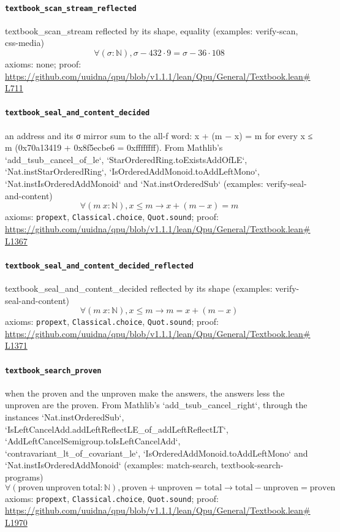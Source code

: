 \documentclass[11pt]{article}
\begin{document}
\paragraph{\texttt{textbook\_scan\_stream\_reflected}}
textbook\_scan\_stream reflected by its shape, equality (examples: verify-scan, css-media)
\[ \forall (\sigma : \mathbb{N}), \sigma - 432 \cdot 9 = \sigma - 36 \cdot 108 \]
\noindent axioms: none; proof: \url{https://github.com/uuidna/qpu/blob/v1.1.1/lean/Qpu/General/Textbook.lean\#L711}

\paragraph{\texttt{textbook\_seal\_and\_content\_decided}}
an address and its σ mirror sum to the all-f word: x + (m − x) = m for every x ≤ m (0x70a13419 + 0x8f5ecbe6 = 0xffffffff). From Mathlib's `add\_tsub\_cancel\_of\_le`, `StarOrderedRing.toExistsAddOfLE`, `Nat.instStarOrderedRing`, `IsOrderedAddMonoid.toAddLeftMono`, `Nat.instIsOrderedAddMonoid` and `Nat.instOrderedSub` (examples: verify-seal-and-content)
\[ \forall (m\ x : \mathbb{N}), x \le m \to x + (m - x) = m \]
\noindent axioms: \texttt{propext}, \texttt{Classical.choice}, \texttt{Quot.sound}; proof: \url{https://github.com/uuidna/qpu/blob/v1.1.1/lean/Qpu/General/Textbook.lean\#L1367}

\paragraph{\texttt{textbook\_seal\_and\_content\_decided\_reflected}}
textbook\_seal\_and\_content\_decided reflected by its shape (examples: verify-seal-and-content)
\[ \forall (m\ x : \mathbb{N}), x \le m \to m = x + (m - x) \]
\noindent axioms: \texttt{propext}, \texttt{Classical.choice}, \texttt{Quot.sound}; proof: \url{https://github.com/uuidna/qpu/blob/v1.1.1/lean/Qpu/General/Textbook.lean\#L1371}

\paragraph{\texttt{textbook\_search\_proven}}
when the proven and the unproven make the answers, the answers less the unproven are the proven. From Mathlib's `add\_tsub\_cancel\_right`, through the instances `Nat.instOrderedSub`, `IsLeftCancelAdd.addLeftReflectLE\_of\_addLeftReflectLT`, `AddLeftCancelSemigroup.toIsLeftCancelAdd`, `contravariant\_lt\_of\_covariant\_le`, `IsOrderedAddMonoid.toAddLeftMono` and `Nat.instIsOrderedAddMonoid` (examples: match-search, textbook-search-programs)
\[ \forall (\mathrm{proven}\ \mathrm{unproven}\ \mathrm{total} : \mathbb{N}), \mathrm{proven} + \mathrm{unproven} = \mathrm{total} \to \mathrm{total} - \mathrm{unproven} = \mathrm{proven} \]
\noindent axioms: \texttt{propext}, \texttt{Classical.choice}, \texttt{Quot.sound}; proof: \url{https://github.com/uuidna/qpu/blob/v1.1.1/lean/Qpu/General/Textbook.lean\#L1970}
\end{document}
